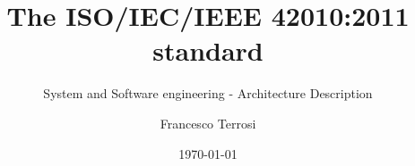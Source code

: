 \documentclass[]{beamer}%
\author{Francesco Terrosi}
\title{The ISO/IEC/IEEE 42010:2011 standard}
\subtitle{System and Software engineering - Architecture Description}
\institute{Università degli studi di Firenze}
\date{\today}
\begin{document}
	
	{\logo{}
	\maketitle}
	
	
	
	
\end{document}
